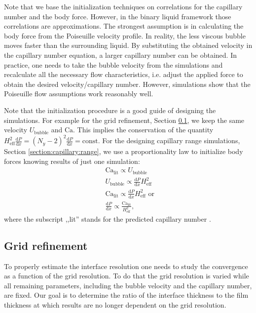 \documentclass[preprint,12pt]{elsarticle}
\newcommand{\Ca}{\mathrm{Ca}}
\begin{document}
Note that we base the initialization techniques on correlations for the
capillary number and the body force. However, in the binary liquid framework
those correlations are approximations. The strongest assumption is
in calculating the body force from the Poiseuille velocity profile.
In reality, the less viscous bubble moves faster than the surrounding liquid. By
substituting the obtained velocity in the capillary number equation, a
larger capillary number can be obtained. In practice, one needs to take the bubble velocity from the
simulations and
recalculate all the necessary flow characteristics, i.e. adjust the
 applied force to obtain the desired velocity/capillary number. However, simulations show that the
Poiseuille flow assumptions work reasonably well.

{\color{red}
Note that the initialization procedure is a good guide of designing the simulations. For example
for the grid refinement, Section \ref{section:grid:refinement}, we keep the same velocity
$U_{\mathrm{bubble}}$ and $\Ca$. This implies the conservation of the quantity
$H_{\mathrm{eff}}^2\frac{\mathrm{d}P}{\mathrm{d}x}=(N_y-2)^2\frac{\mathrm{d}P}{\mathrm{d}
x } = \mathrm{const}$. For the designing capillary range simulations, Section
\ref{section:capillary:range}, we use a proportionality law to initialize body forces knowing
results of just one simulation:
\begin{equation}
\begin{aligned}
&\Ca_{\mathrm{lit}} \propto U_{\mathrm{bubble}}\\
&U_{\mathrm{bubble}} \propto \frac{\mathrm{d}P}{\mathrm{d}x} H_{\mathrm{eff}}^2\\
&\Ca_{\mathrm{lit}} \propto \frac{\mathrm{d}P}{\mathrm{d} x} H_{\mathrm{eff}}^2 \text{ or }\\
&\frac{\mathrm{d}P}{\mathrm{d} x} \propto \frac{\Ca_{\mathrm{lit}}}{H_{\mathrm{eff}}^2},
\end{aligned}
\end{equation}
where the subscript ,,lit'' stands for the predicted capillary number
\cite{giavedoni-numerical,heil-bretherton}. 
}
\subsection{Grid refinement}
\label{section:grid:refinement}
To properly estimate the interface resolution one needs to study the convergence as a function of
the grid resolution. To do that the grid resolution is varied while all remaining parameters,
including the bubble velocity and the capillary number, are fixed.  Our goal is to determine the 
ratio of the interface thickness to the 
film thickness at which results are no longer dependent on the grid resolution.
\end{document}
